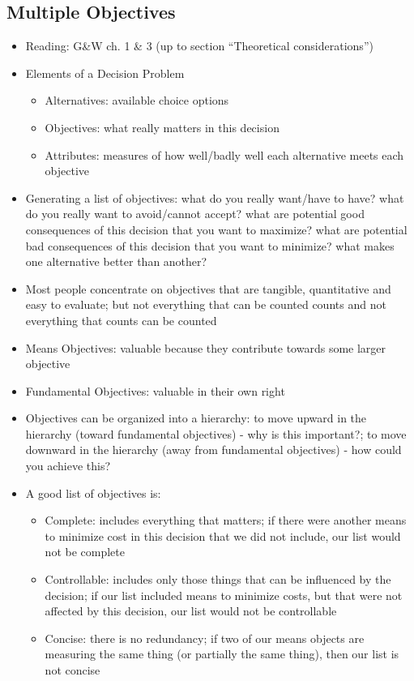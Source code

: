 \documentclass[12pt]{article}
\begin{document}
\subsection{Multiple Objectives}
\begin{itemize}
\item Reading: G\&W ch. 1 \& 3 (up to section ``Theoretical considerations'')
\item Elements of a Decision Problem \begin{itemize} 
\item Alternatives: available choice options 
\item Objectives: what really matters in this decision 
\item Attributes: measures of how well/badly well each alternative meets each objective \end{itemize} 
\item Generating a list of objectives: what do you really want/have to have? what do you really want to avoid/cannot accept? what are potential good consequences of this decision that you want to maximize? what are potential bad consequences of this decision that you want to minimize? what makes one alternative better than another? 
\item Most people concentrate on objectives that are tangible, quantitative and easy to evaluate; but not everything that can be counted counts and not everything that counts can be counted 
\item Means Objectives: valuable because they contribute towards some larger objective 
\item Fundamental Objectives: valuable in their own right 
\item Objectives can be organized into a hierarchy: to move upward in the hierarchy (toward fundamental objectives) - why is this important?; to move downward in the hierarchy (away from fundamental objectives) - how could you achieve this? 
\item A good list of objectives is: \begin{itemize} 
\item Complete: includes everything that matters; if there were another means to minimize cost in this decision that we did not include, our list would not be complete
\item Controllable: includes only those things that can be influenced by the decision; if our list included means to minimize costs, but that were not affected by this decision, our list would not be controllable
\item Concise: there is no redundancy; if two of our means objects are measuring the same thing (or partially the same thing), then our list is not concise

\end{itemize}
\end{itemize}
\end{document}

